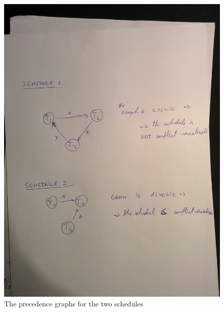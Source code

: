 \documentclass{article}      %
\begin{document}
\begin{figure}[ht!]
\centering
 \includegraphics[scale=.15]{q1}
\caption{The precedence graphs for the two schedules \label{overflow}}
\end{figure}


\newpage
\end{document}
